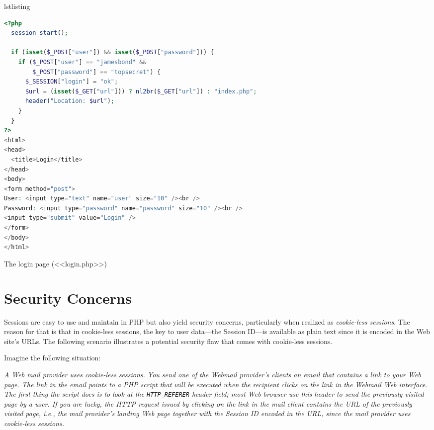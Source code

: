\documentclass[a4paper, justified, notoc]{tufte-handout} %
\makeatletter
\newenvironment{listing}[1][htbp]
  {\ifvmode\else\unskip\fi\begin{@tufte@float}[#1]{lstlisting}{}}
  {\end{@tufte@float} } %
\makeatother
\begin{document}
\begin{listing}
\begin{lstlisting}[language=PHP]
<?php
  session_start();

  if (isset($_POST["user"]) && isset($_POST["password"])) {
    if ($_POST["user"] == "jamesbond" && 
        $_POST["password"] == "topsecret") {
      $_SESSION["login"] = "ok";
      $url = (isset($_GET["url"])) ? nl2br($_GET["url"]) : "index.php";
      header("Location: $url");
    }
  }
?>
<html>
<head>
  <title>Login</title>
</head>
<body>
<form method="post">
User: <input type="text" name="user" size="10" /><br />
Password: <input type="password" name="password" size="10" /><br />
<input type="submit" value="Login" />
</form>
</body>
</html>
\end{lstlisting}
	\caption{The login page (<<login.php>>)}
	\label{login_page}
\end{listing}

\newpage
\section{Security Concerns} %
\label{sec:security_concerns}
Sessions are easy to use and maintain in PHP but also yield security concerns, particularly when realized as \emph{cookie-less sessions}. 
The reason for that is that in cookie-less sessions, the key to user data---the Session ID---is available as plain text since it is encoded in the Web site's URLs.
The following scenario illustrates a potential security flaw that comes with cookie-less sessions.

Imagine the following situation:

\emph{A Web mail provider uses cookie-less sessions.
You send one of the Webmail provider's clients an email that contains a link to your Web page.
The link in the email points to a PHP script that will be executed when the recipient clicks on the link in the Webmail Web interface.
The first thing the script does is to look at the \texttt{HTTP\_REFERER} header field; 
most Web browser use this header to send the previously visited page by a user. 
If you are lucky, the HTTP request issued by clicking on the link in the mail client contains the URL of the previously visited page, i.e., the mail provider's landing Web page together with the Session ID encoded in the URL, since the mail provider uses cookie-less sessions. }
\end{document}
